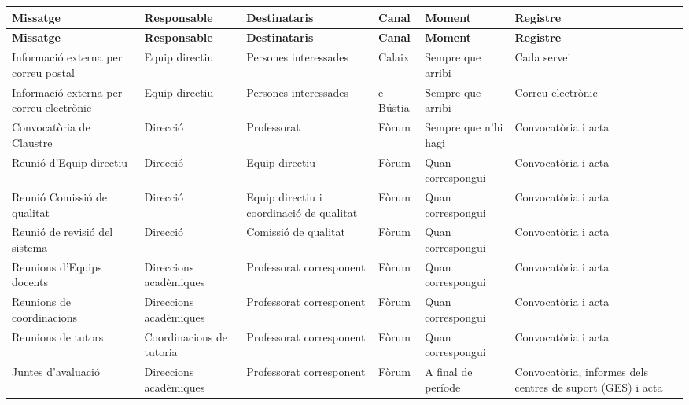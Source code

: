 \documentclass[fontsize=10pt,%
paper=a4,%
DIV=14,%
pagesize=auto,%
parskip=half,
captions=tableheading,%
numbers=noenddot,%
toc=graduated%
]{scrartcl}
\renewcommand{\arraystretch}{1.75}%
\renewcommand{\arraystretch}{1.75}%
\begin{document}
\small{
\setlength{\tabcolsep}{10pt}
\renewcommand{\arraystretch}{1.5}
\begin{longtable}{p{3cm}p{2cm}p{2cm}p{1.5cm}p{2cm}p{1.5cm}}
\hline
\textbf{Missatge}                        & \textbf{Responsable}     & \textbf{Destinataris}                    & \textbf{Canal} & \textbf{Moment}      & \textbf{Registre}                                          \\
\hline \endfirsthead
\hline
\textbf{Missatge}                        & \textbf{Responsable}     & \textbf{Destinataris}                    & \textbf{Canal} & \textbf{Moment}      & \textbf{Registre}                                          \\
\hline \endhead
Informació externa per correu postal     & Equip directiu           & Persones interessades                    & Calaix         & Sempre que arribi    & Cada servei                                                \\
Informació externa per correu electrònic & Equip directiu           & Persones interessades                    & e-Bústia       & Sempre que arribi    & Correu electrònic                                          \\
Convocatòria de Claustre                 & Direcció                 & Professorat                              & Fòrum          & Sempre que n'hi hagi & Convocatòria i acta                                        \\
Reunió d'Equip directiu                  & Direcció                 & Equip directiu                           & Fòrum          & Quan correspongui    & Convocatòria i acta                                        \\
Reunió Comissió de qualitat              & Direcció                 & Equip directiu i coordinació de qualitat & Fòrum          & Quan correspongui    & Convocatòria i acta                                        \\
Reunió de revisió del sistema            & Direcció                 & Comissió de qualitat                     & Fòrum          & Quan correspongui    & Convocatòria i acta                                        \\
Reunions d'Equips docents                & Direccions acadèmiques   & Professorat corresponent                 & Fòrum          & Quan correspongui    & Convocatòria i acta                                        \\
Reunions de coordinacions                & Direccions acadèmiques   & Professorat corresponent                 & Fòrum          & Quan correspongui    & Convocatòria i acta                                        \\
Reunions de tutors                       & Coordinacions de tutoria & Professorat corresponent                 & Fòrum          & Quan correspongui    & Convocatòria i acta                                        \\
Juntes d'avaluació                       & Direccions acadèmiques   & Professorat corresponent                 & Fòrum          & A final de període   & Convocatòria, informes dels centres de suport (GES) i acta \\
\end{longtable}
}%
\end{document}
